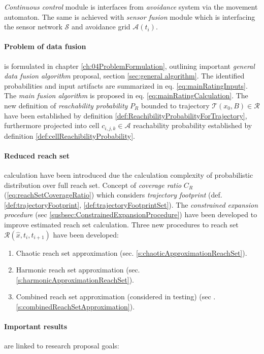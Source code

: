 \emph{Continuous control} module is interfaces from \emph{avoidance} system via the movement automaton. The same is achieved with \emph{sensor fusion} module which is interfacing the sensor network $\mathscr{S}$ and avoidance grid $\mathscr{A}(t_i)$.

\paragraph{Problem of data fusion} is formulated in chapter \ref{ch:04ProblemFormulation}, outlining important \emph{general data fusion algorithm} proposal, section \ref{sec:general algorithm}. The identified probabilities and input artifacts are summarized in eq. \ref{eq:mainRatingInputs}. The \emph{main fusion algorithm} is proposed in eq. \ref{eq:mainRatingCalculation}. The new definition of \emph{reachability probability} $P_R$ bounded to trajectory $\mathscr{T}(x_0,B)\in\mathscr{R}$ have been established by definition \ref{def:ReachibilityProbabilityForTrajectory}, furthermore projected into cell $c_{i,j,k}\in\mathscr{A}$ reachability probability established by definition \ref{def:cellReachibilityProbability}.

\paragraph{Reduced reach set} calculation have been introduced due the calculation complexity of probabilistic distribution over full reach set. Concept of \emph{coverage ratio} $C_R$ (\ref{eq:reachSetCoverageRatio}) which considers \emph{trajectory footprint} (def. \ref{def:trajectoryFootprint}, \ref{def:trajectoryFootprintSet}). The \emph{constrained expansion procedure} (sec \ref{susbsec:ConstrainedExpansionProcedure}) have been developed to improve estimated reach set calculation. Three new procedures to reach set $\mathscr{R}(\hat{x},t_i,t_{i+1})$ have been developed:
\begin{enumerate}
    \item Chaotic reach set approximation (sec. \ref{s:chaoticApproximationReachSet}).
    \item Harmonic reach set approximation (sec. \ref{s:harmonicApproximationReachSet}).
    \item Combined reach set approximation (considered in testing) (sec .\ref{s:combinedReachSetApproximation}).
\end{enumerate}

\paragraph{Important results} are linked to research proposal goals:

